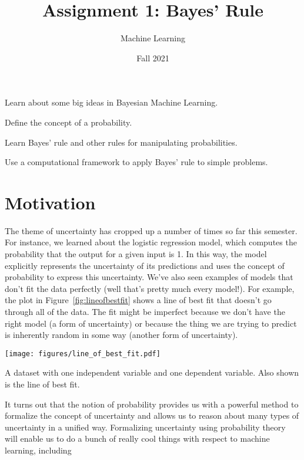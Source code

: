 \documentclass[assignment01_Solutions]{subfiles}
\title{Assignment 1: Bayes' Rule}
\author{Machine Learning}
\date{Fall 2021}
\begin{document}
\maketitle
\thispagestyle{firstpage}


\begin{learningobjectives}
\bi
\item Learn about some big ideas in Bayesian Machine Learning.
\item Define the concept of a probability.
\item Learn Bayes' rule and other rules for manipulating probabilities.
\item Use a computational framework to apply Bayes' rule to simple problems.
\ei
\end{learningobjectives}

\section{Motivation}
The theme of uncertainty has cropped up a number of times so far this semester.  For instance, we learned about the logistic regression model, which computes the probability that the output for a given input is 1.  In this way, the model explicitly represents the uncertainty of its predictions and uses the concept of probability to express this uncertainty.  We’ve also seen examples of models that don’t fit the data perfectly (well that's pretty much every model!).  For example, the plot in Figure~\ref{fig:lineofbestfit} shows a line of best fit that doesn't go through all of the data.  The fit might be imperfect because we don't have the right model (a form of uncertainty) or because the thing we are trying to predict is inherently random in some way (another form of uncertainty).
\begin{marginfigure}
\texttt{[image: figures/line\_of\_best\_fit.pdf]}
\caption{A dataset with one independent variable and one dependent variable.  Also shown is the line of best fit.\label{fig:lineofbestfit}}
\end{marginfigure}


It turns out that the notion of probability provides us with a powerful method to formalize the concept of uncertainty and allows us to reason about many types of uncertainty in a unified way.  Formalizing uncertainty using probability theory will enable us to do a bunch of really cool things with respect to machine learning, including
\end{document}
